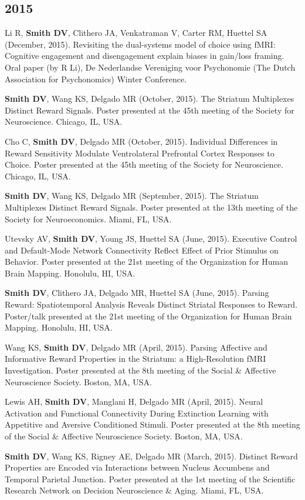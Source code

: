 \documentclass[11pt, letterpaper]{article}
\begin{document}
\subsection*{2015}
\begin{hangparas}{.5in}{1}
Li R, \textbf{Smith DV}, Clithero JA, Venkatraman V, Carter RM, Huettel SA (December, 2015). Revisiting the dual-systems model of choice using fMRI: Cognitive engagement and disengagement explain biases in gain/loss framing. Oral paper (by R Li), De Nederlandse Vereniging voor Psychonomie (The Dutch Association for Psychonomics) Winter Conference.

\textbf{Smith DV}, Wang KS, Delgado MR (October, 2015). The Striatum Multiplexes Distinct Reward Signals. Poster presented at the 45th meeting of the Society for Neuroscience. Chicago, IL, USA.

Cho C, \textbf{Smith DV}, Delgado MR (October, 2015). Individual Differences in Reward Sensitivity Modulate Ventrolateral Prefrontal Cortex Responses to Choice. Poster presented at the 45th meeting of the Society for Neuroscience. Chicago, IL, USA.

\textbf{Smith DV}, Wang KS, Delgado MR (September, 2015). The Striatum Multiplexes Distinct Reward Signals. Poster presented at the 13th meeting of the Society for Neuroeconomics. Miami, FL, USA.

Utevsky AV, \textbf{Smith DV}, Young JS, Huettel SA (June, 2015). Executive Control and Default-Mode Network Connectivity Reflect Effect of Prior Stimulus on Behavior. Poster presented at the 21st meeting of the Organization for Human Brain Mapping. Honolulu, HI, USA.

\textbf{Smith DV}, Clithero JA, Delgado MR, Huettel SA (June, 2015). Parsing Reward: Spatiotemporal Analysis Reveals Distinct Striatal Responses to Reward. Poster/talk presented at the 21st meeting of the Organization for Human Brain Mapping. Honolulu, HI, USA.

Wang KS, \textbf{Smith DV}, Delgado MR (April, 2015). Parsing Affective and Informative Reward Properties in the Striatum: a High-Resolution fMRI Investigation. Poster presented at the 8th meeting of the Social \& Affective Neuroscience Society. Boston, MA, USA.

Lewis AH, \textbf{Smith DV}, Manglani H, Delgado MR (April, 2015). Neural Activation and Functional Connectivity During Extinction Learning with Appetitive and Aversive Conditioned Stimuli. Poster presented at the 8th meeting of the Social \& Affective Neuroscience Society. Boston, MA, USA.

\textbf{Smith DV}, Wang KS, Rigney AE, Delgado MR (March, 2015). Distinct Reward Properties are Encoded via Interactions between Nucleus Accumbens and Temporal Parietal Junction. Poster presented at the 1st meeting of the Scientific Research Network on Decision Neuroscience \& Aging. Miami, FL, USA. \\

\end{hangparas}
\end{document}
